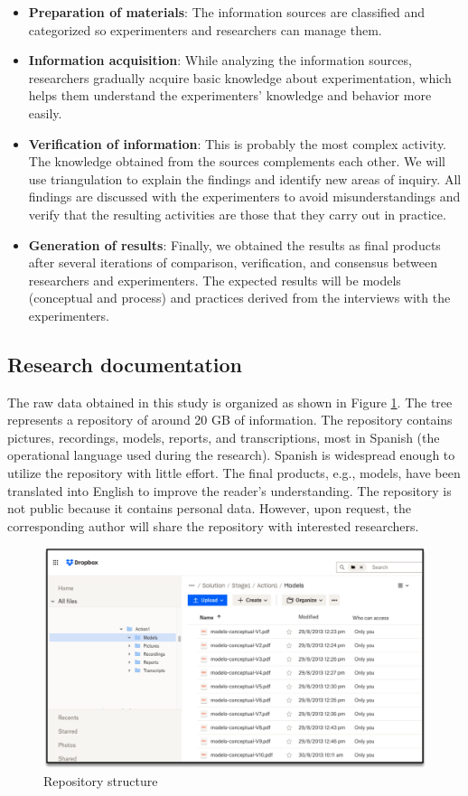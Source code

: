 \begin{itemize}
\item \textbf{Preparation of materials}: The information sources are classified and categorized so experimenters and researchers can manage them.
\item \textbf{Information acquisition}: While analyzing the information sources, researchers gradually acquire basic knowledge about experimentation, which helps them understand the experimenters' knowledge and behavior more easily.
\item \textbf{Verification of information}: This is probably the most complex activity. The knowledge obtained from the sources complements each other. We will use triangulation to explain the findings and identify new areas of inquiry. All findings are discussed with the experimenters to avoid misunderstandings and verify that the resulting activities are those that they carry out in practice.
\item \textbf{Generation of results}: Finally, we obtained the results as final products after several iterations of comparison, verification, and consensus between researchers and experimenters. The expected results will be models (conceptual and process) and practices derived from the interviews with the experimenters.
\end{itemize}

\subsection{Research documentation}\label{sub-sec-research-documentaition}
The raw data obtained in this study is organized as shown in Figure \ref{fig-info-study}. The tree represents a repository of around 20 GB of information. The repository contains pictures, recordings, models, reports, and transcriptions, most in Spanish (the operational language used during the research). Spanish is widespread enough to utilize the repository with little effort. The final products, e.g., models, have been translated into English to improve the reader's understanding. The repository is not public because it contains personal data. However, upon request, the corresponding author will share the repository with interested researchers.

\begin{figure}[htbp!]
	\centering
	\includegraphics[width=\columnwidth]{images/Intermediate-Products}
	\caption{Repository structure}
	\label{fig-info-study}
\end{figure}
